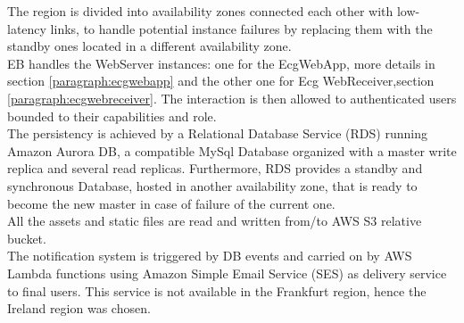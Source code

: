 The region is divided into availability zones connected each other with low-latency links, to handle potential instance failures by replacing them with the standby ones located in a different availability zone.\\
EB handles the WebServer instances: one for the EcgWebApp, more details in section \ref{paragraph:ecgwebapp} and the other one for Ecg WebReceiver,section \ref{paragraph:ecgwebreceiver}. The interaction is then allowed to authenticated users bounded to their capabilities and role.\\
The persistency is achieved by a Relational Database Service (RDS) running Amazon Aurora DB, a compatible MySql Database organized with a master write replica and several read replicas.
Furthermore, RDS provides a standby and synchronous Database, hosted in another availability zone, that is ready to become the new master in case of failure of the current one.\\
All the assets and static files are read and written from/to AWS S3 relative bucket.\\
The notification system is triggered by DB events and carried on by AWS Lambda functions using Amazon Simple Email Service (SES) as delivery service to final users. This service is not available in the Frankfurt region, hence the Ireland region was chosen.

